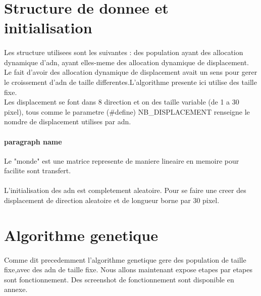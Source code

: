 \documentclass{article}
\begin{document}
\section{Structure de donnee et initialisation} %
\label{sec:Structure de donnee}
  \paragraph{} %
  \label{par:}
    Les structure utilisees sont les suivantes : des population ayant des allocation dynamique
    d'adn, ayant elles-meme des allocation dynamique de displacement. Le fait d'avoir des
    allocation dynamique de displacement avait un sens pour gerer le croissement d'adn de
    taille differentes.L'algorithme presente ici utilise des taille fixe.\\
    Les displacement se font dans 8 direction et on des taille variable (de 1 a 30 pixel),
    tous comme le parametre (#define) NB\_DISPLACEMENT renseigne le nomdre de displacement
    utilises par adn.
    \paragraph{paragraph name} %
    \label{par:paragraph name}
      Le "monde" est une matrice represente de maniere lineaire en memoire pour facilite
      sont transfert.
    \paragraph{} %
    \label{par:}
      L'initialisation des adn est completement aleatoire. Pour se faire une creer des
      displacement de direction aleatoire et de longueur borne par 30 pixel. 

\section{Algorithme genetique } %
  \paragraph{} %
  \label{par:}
    Comme dit precedemment l'algorithme genetique gere des population de taille fixe,avec
    des adn de taille fixe. Nous allons maintenant expose etapes par etapes sont
    fonctionnement. Des screenshot de fonctionnement sont disponible en annexe.
\end{document}
